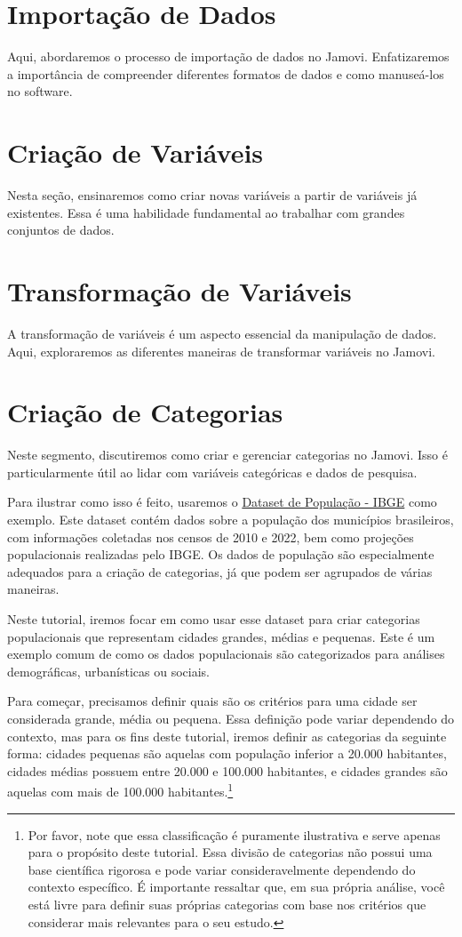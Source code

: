 \section{Importação de Dados}
Aqui, abordaremos o processo de importação de dados no Jamovi. Enfatizaremos a importância de compreender diferentes formatos de dados e como manuseá-los no software.

\section{Criação de Variáveis}
Nesta seção, ensinaremos como criar novas variáveis a partir de variáveis já existentes. Essa é uma habilidade fundamental ao trabalhar com grandes conjuntos de dados.

\section{Transformação de Variáveis}
A transformação de variáveis é um aspecto essencial da manipulação de dados. Aqui, exploraremos as diferentes maneiras de transformar variáveis no Jamovi.

\section{Criação de Categorias}
Neste segmento, discutiremos como criar e gerenciar categorias no Jamovi. Isso é particularmente útil ao lidar com variáveis categóricas e dados de pesquisa.

Para ilustrar como isso é feito, usaremos o \href{https://github.com/balaio-cientifico/dataset/blob/main/pop_ts.txt}{Dataset de População - IBGE} como exemplo. Este dataset contém dados sobre a população dos municípios brasileiros, com informações coletadas nos censos de 2010 e 2022, bem como projeções populacionais realizadas pelo IBGE. Os dados de população são especialmente adequados para a criação de categorias, já que podem ser agrupados de várias maneiras.

Neste tutorial, iremos focar em como usar esse dataset para criar categorias populacionais que representam cidades grandes, médias e pequenas. Este é um exemplo comum de como os dados populacionais são categorizados para análises demográficas, urbanísticas ou sociais.

Para começar, precisamos definir quais são os critérios para uma cidade ser considerada grande, média ou pequena. Essa definição pode variar dependendo do contexto, mas para os fins deste tutorial, iremos definir as categorias da seguinte forma: cidades pequenas são aquelas com população inferior a 20.000 habitantes, cidades médias possuem entre 20.000 e 100.000 habitantes, e cidades grandes são aquelas com mais de 100.000 habitantes.\footnote{Por favor, note que essa classificação é puramente ilustrativa e serve apenas para o propósito deste tutorial. Essa divisão de categorias não possui uma base científica rigorosa e pode variar consideravelmente dependendo do contexto específico. É importante ressaltar que, em sua própria análise, você está livre para definir suas próprias categorias com base nos critérios que considerar mais relevantes para o seu estudo.}


